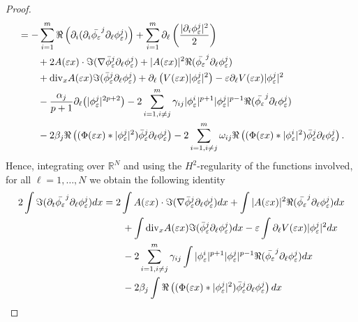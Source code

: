 \documentclass[11pt]{amsart}
\numberwithin{equation}{section}
\theoremstyle{definition}
\begin{document}
\begin{proof}
$$\begin{aligned}
&=-\sum_{i=1}^{m}{{\Re}}\left(\partial_i(\partial_i
\bar{\phi_{\varepsilon}}^j\partial_\ell\phi_{\varepsilon}^j)\right)
+\sum_{i=1}^{m}\partial_\ell\left(\frac{|\partial_i\phi_{\varepsilon}^j|^2}{2}\right)\\
& \qquad +2A({\varepsilon} x)\cdot{{\Im}}(\nabla
\bar\phi_{\varepsilon}^j\partial_\ell\phi_{\varepsilon}^j)
+|A({\varepsilon} x)|^2{{\Re}}(\bar{\phi_{\varepsilon}}^j\partial_\ell\phi_{\varepsilon}^j)  \\
& \qquad +{\rm div}_xA({\varepsilon}
x){{\Im}}(\bar\phi_{\varepsilon}^j\partial_\ell\phi_{\varepsilon}^j)+
\partial_\ell\left(V({\varepsilon} x)|\phi_{\varepsilon}^j|^2\right)
-{\varepsilon} \partial_\ell V({\varepsilon} x)|\phi_{\varepsilon}^j|^2\\
& \qquad
-\frac{\alpha_j}{p+1}\partial_\ell\big(|\phi_{\varepsilon}^j|^{2p+2}\big)
-2\sum_{i=1, i\not =
j}^m\gamma_{ij}|\phi_{\varepsilon}^i|^{p+1}|\phi_{\varepsilon}^j|^{p-1}
{{\Re}}(\bar{\phi_{\varepsilon}}^j\partial_\ell\phi_{\varepsilon}^j)\\
& \qquad - 2\beta_j {{\Re}}\left((\Phi({\varepsilon} x)*|\phi_{\varepsilon}^j|^2)\bar
\phi_{\varepsilon}^j\partial_\ell\phi_{\varepsilon}^j\right)- 2\sum_{i=1, i\not =
j}^m\omega_{ij} {{\Re}}\left((\Phi({\varepsilon} x)*|\phi_{\varepsilon}^i|^2)\bar
\phi_{\varepsilon}^j\partial_\ell\phi_{\varepsilon}^j\right).
\end{aligned}$$
Hence, integrating over ${{\mathbb R}}^N$ and using the
$H^2$-regularity of the functions involved, for all $\ell=1, \dots,
N$ we obtain the following identity
$$\begin{aligned}
2 \int
{{\Im}}(\partial_{t}\bar{\phi_{\varepsilon}}^j\partial_\ell\phi_{\varepsilon}^j)dx
&=2\int A({\varepsilon} x)\cdot{{\Im}}(\nabla
\bar\phi_{\varepsilon}^j\partial_\ell\phi_{\varepsilon}^j)dx
+\int|A({\varepsilon} x)|^2{{\Re}}(\bar{\phi_{\varepsilon}}^j\partial_\ell\phi_{\varepsilon}^j)dx  \\
& \qquad +\int{\rm div}_xA({\varepsilon}
x){{\Im}}(\bar\phi_{\varepsilon}^j\partial_\ell\phi_{\varepsilon}^j)dx
-{\varepsilon} \int\partial_\ell V({\varepsilon} x)|\phi_{\varepsilon}^j|^2dx\\
& \qquad -2\sum_{i=1, i\not = j}^m\gamma_{ij}
\int |\phi_{\varepsilon}^i|^{p+1}|\phi_{\varepsilon}^j|^{p-1}{{\Re}}(\bar{\phi_{\varepsilon}}^j\partial_\ell\phi_{\varepsilon}^j)dx\\
& \qquad - 2\beta_j \int{{\Re}}\left((\Phi({\varepsilon} x)*|\phi_{\varepsilon}^j|^2)\bar
\phi_{\varepsilon}^j\partial_\ell\phi_{\varepsilon}^j\right)dx\\

\end{aligned}$$
\end{proof}
\end{document}
